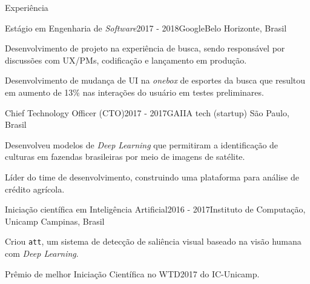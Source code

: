 \documentclass[8pt]{resume}
\newcommand{\tit}[1]{\textit{#1}}
\newcommand{\ttt}[1]{\texttt{#1}}
\begin{document}
\begin{rSection}{Experiência}

\begin{rSubsection}{Estágio em Engenharia de \tit{Software}}{2017 - 2018}{Google}{Belo Horizonte, Brasil}
    \item Desenvolvimento de projeto na experiência de busca, sendo responsável
        por discussões com UX/PMs, codificação e lançamento em produção.
    \item Desenvolvimento de mudança de UI na \tit{onebox} de esportes
        da busca que resultou em aumento de 13\% nas interações do usuário
        em testes preliminares.
\end{rSubsection}

\begin{rSubsection}{Chief Technology Officer (CTO)}{2017 - 2017}{GAIIA tech (startup)}
    {São Paulo, Brasil}
    \item Desenvolveu modelos de \tit{Deep Learning} que permitiram a identificação
        de culturas em fazendas brasileiras por meio de imagens de satélite.
    \item Líder do time de desenvolvimento, construindo uma plataforma para
        análise de crédito agrícola.
\end{rSubsection}

\begin{rSubsection}{Iniciação científica em Inteligência Artificial}{2016 - 2017}{Instituto de Computação, Unicamp}
    {Campinas, Brasil}
    \item Criou \ttt{att}, um sistema de detecção de saliência visual
        baseado na visão humana com \tit{Deep Learning}.
    \item Prêmio de melhor Iniciação Científica no WTD2017 do IC-Unicamp.
\end{rSubsection}


\end{rSection}
\end{document}
